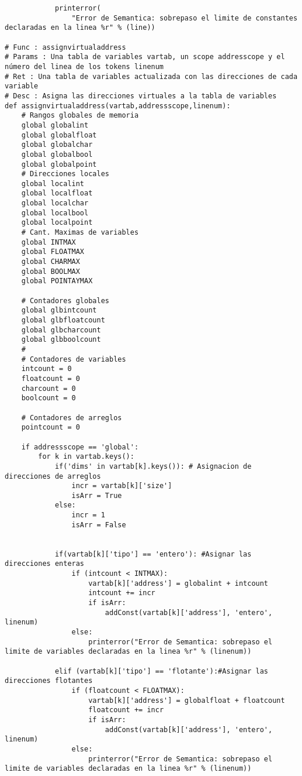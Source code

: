 \documentclass[krantz1,ChapterTOCs, spanish]{krantz}
\begin{document}
\begin{verbatim}
            printerror(
                "Error de Semantica: sobrepaso el limite de constantes declaradas en la linea %r" % (line))

# Func : assignvirtualaddress
# Params : Una tabla de variables vartab, un scope addresscope y el número del linea de los tokens linenum
# Ret : Una tabla de variables actualizada con las direcciones de cada variable
# Desc : Asigna las direcciones virtuales a la tabla de variables
def assignvirtualaddress(vartab,addressscope,linenum):
    # Rangos globales de memoria
    global globalint
    global globalfloat
    global globalchar
    global globalbool
    global globalpoint
    # Direcciones locales
    global localint
    global localfloat
    global localchar
    global localbool
    global localpoint
    # Cant. Maximas de variables
    global INTMAX
    global FLOATMAX
    global CHARMAX
    global BOOLMAX
    global POINTAYMAX

    # Contadores globales
    global glbintcount
    global glbfloatcount
    global glbcharcount
    global glbboolcount
    #
    # Contadores de variables
    intcount = 0
    floatcount = 0
    charcount = 0
    boolcount = 0

    # Contadores de arreglos
    pointcount = 0

    if addressscope == 'global':
        for k in vartab.keys():
            if('dims' in vartab[k].keys()): # Asignacion de direcciones de arreglos
                incr = vartab[k]['size']
                isArr = True
            else:
                incr = 1
                isArr = False


            if(vartab[k]['tipo'] == 'entero'): #Asignar las direcciones enteras
                if (intcount < INTMAX):
                    vartab[k]['address'] = globalint + intcount
                    intcount += incr
                    if isArr:
                        addConst(vartab[k]['address'], 'entero', linenum)
                else:
                    printerror("Error de Semantica: sobrepaso el limite de variables declaradas en la linea %r" % (linenum))

            elif (vartab[k]['tipo'] == 'flotante'):#Asignar las direcciones flotantes
                if (floatcount < FLOATMAX):
                    vartab[k]['address'] = globalfloat + floatcount
                    floatcount += incr
                    if isArr:
                        addConst(vartab[k]['address'], 'entero', linenum)
                else:
                    printerror("Error de Semantica: sobrepaso el limite de variables declaradas en la linea %r" % (linenum))


\end{verbatim}
\end{document}
